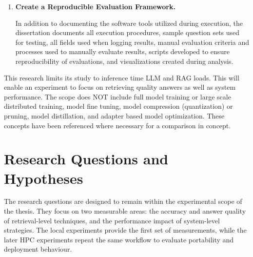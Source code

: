 \begin{enumerate}
    Prior to executing the HPC portion of the dissertation research effort, local results are collected first. Once local results have been collected, notebooks for local execution are prepared for eventual execution on an HPC platform. The ultimate goal for the \ac{HPC} phase is to execute both local and \ac{HPC} versions of the dissertation's evaluation framework, allowing researchers to account for additional overhead factors such as scheduling delays, container startup times, storage access latency, and data transfer costs.
    
    \item \textbf{Create a Reproducible Evaluation Framework.}
    
    In addition to documenting the software tools utilized during execution, the dissertation documents all execution procedures, sample question sets used for testing, all fields used when logging results, manual evaluation criteria and processes used to manually evaluate results, scripts developed to ensure reproducibility of evaluations, and visualizations created during analysis.
\end{enumerate}

    This research limits its study to inference time \ac{LLM} and \ac{RAG} loads. This will enable an experiment to focus on retrieving quality answers as well as system performance. The scope does NOT include full model training or large scale distributed training, model fine tuning, model compression (quantization) or pruning, model distillation, and adapter based model optimization. These concepts have been referenced where necessary for a comparison in concept.

\section{Research Questions and Hypotheses}

The research questions are designed to remain within the experimental scope of the thesis. They focus on two measurable areas: the accuracy and answer quality of retrieval-level techniques, and the performance impact of system-level strategies. The local experiments provide the first set of measurements, while the later \ac{HPC} experiments repeat the same workflow to evaluate portability and deployment behaviour.

